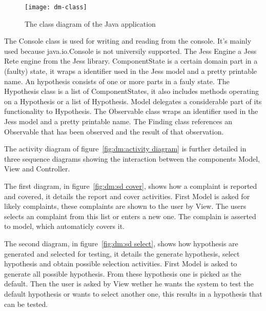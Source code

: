\begin{figure}[htbp]
    \centering
    \texttt{[image: dm-class]}
    \caption{The class diagram of the Java application}
    \label{fig:dm:class diagram}
\end{figure}

The Console class is used for writing and reading from the console. It's mainly
used because java.io.Console is not universily supported. The Jess Engine a Jess
Rete engine from the Jess library. ComponentState is a certain domain part in a
(faulty) state, it wraps a identifier used in the Jess model and a pretty
printable name. An hypothesis consists of one or more parts in a fauly state.
The Hypothesis class  is a list of ComponentStates, it also includes methods operating on
a Hypothesis or a list of Hypothesis. Model delegates a considerable part of its
functionality to Hypothesis. The Observable class wraps an identifier used in the Jess model and a pretty
printable name. The Finding class references an Observable that has been
observed and the result of that observation.

The activity diagram of figure~\ref{fig:dm:activity diagram} is further detailed
in three sequence diagrams showing the interaction between the components Model, View and
Controller.

The first diagram, in figure~\ref{fig:dm:sd cover}, shows how a complaint is
reported and covered, it details the report and cover activities. First Model
is asked for likely complaints, these complaints are shown to the user by View.
The users selects an complaint from this list or enters a new one. The complain
is asserted to model, which automaticly covers it.

The second diagram, in figure~\ref{fig:dm:sd select}, shows how hypothesis are generated
and selected for testing, it details the generate hypothesis, select hypothesis
and obtain possible selection activities. First Model is asked to generate all
possible hypothesis. From these hypothesis one is picked as the default. Then
the user is asked by View wether he wants the system to test the default
hypothesis or wants to select another one, this results in a hypothesis that can
be tested.

